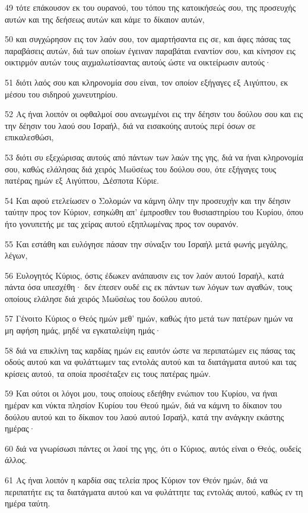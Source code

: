 \par 49 τότε επάκουσον εκ του ουρανού, του τόπου της κατοικήσεώς σου, της προσευχής αυτών και της δεήσεως αυτών και κάμε το δίκαιον αυτών,
\par 50 και συγχώρησον εις τον λαόν σου, τον αμαρτήσαντα εις σε, και άφες πάσας τας παραβάσεις αυτών, διά των οποίων έγειναν παραβάται εναντίον σου, και κίνησον εις οικτιρμόν αυτών τους αιχμαλωτίσαντας αυτούς ώστε να οικτείρωσιν αυτούς·
\par 51 διότι λαός σου και κληρονομία σου είναι, τον οποίον εξήγαγες εξ Αιγύπτου, εκ μέσου του σιδηρού χωνευτηρίου.
\par 52 Ας ήναι λοιπόν οι οφθαλμοί σου ανεωγμένοι εις την δέησιν του δούλου σου και εις την δέησιν του λαού σου Ισραήλ, διά να εισακούης αυτούς περί όσων σε επικαλεσθώσι,
\par 53 διότι συ εξεχώρισας αυτούς από πάντων των λαών της γης, διά να ήναι κληρονομία σου, καθώς ελάλησας διά χειρός Μωϋσέως του δούλου σου, ότε εξήγαγες τους πατέρας ημών εξ Αιγύπτου, Δέσποτα Κύριε.
\par 54 Και αφού ετελείωσεν ο Σολομών να κάμνη όλην την προσευχήν και την δέησιν ταύτην προς τον Κύριον, εσηκώθη απ' έμπροσθεν του θυσιαστηρίου του Κυρίου, όπου ήτο γονυπετής με τας χείρας αυτού εξηπλωμένας προς τον ουρανόν.
\par 55 Και εστάθη και ευλόγησε πάσαν την σύναξιν του Ισραήλ μετά φωνής μεγάλης, λέγων,
\par 56 Ευλογητός Κύριος, όστις έδωκεν ανάπαυσιν εις τον λαόν αυτού Ισραήλ, κατά πάντα όσα υπεσχέθη· δεν έπεσεν ουδέ εις εκ πάντων των λόγων των αγαθών, τους οποίους ελάλησε διά χειρός Μωϋσέως του δούλου αυτού.
\par 57 Γένοιτο Κύριος ο Θεός ημών μεθ' ημών, καθώς ήτο μετά των πατέρων ημών να μη αφήση ημάς, μηδέ να εγκαταλείψη ημάς·
\par 58 διά να επικλίνη τας καρδίας ημών εις εαυτόν ώστε να περιπατώμεν εις πάσας τας οδούς αυτού και να φυλάττωμεν τας εντολάς αυτού και τα διατάγματα αυτού και τας κρίσεις αυτού, τα οποία προσέταξεν εις τους πατέρας ημών.
\par 59 Και ούτοι οι λόγοι μου, τους οποίους εδεήθην ενώπιον του Κυρίου, να ήναι ημέραν και νύκτα πλησίον Κυρίου του Θεού ημών, διά να κάμνη το δίκαιον του δούλου αυτού και το δίκαιον του λαού αυτού Ισραήλ, κατά την ανάγκην εκάστης ημέρας·
\par 60 διά να γνωρίσωσι πάντες οι λαοί της γης, ότι ο Κύριος, αυτός είναι ο Θεός, ουδείς άλλος.
\par 61 Ας ήναι λοιπόν η καρδία σας τελεία προς Κύριον τον Θεόν ημών, διά να περιπατήτε εις τα διατάγματα αυτού και να φυλάττητε τας εντολάς αυτού, καθώς εν τη ημέρα ταύτη.
